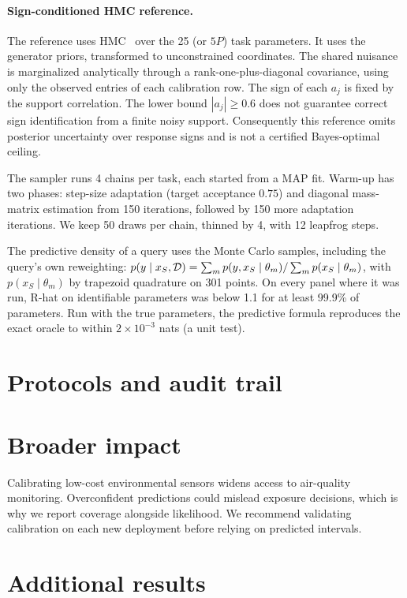 \paragraph{Sign-conditioned HMC reference.}
The reference uses HMC~\citep{neal2011hmc} over the 25 (or $5P$) task parameters. It uses the generator priors, transformed to
unconstrained coordinates. The shared nuisance is marginalized analytically through a rank-one-plus-diagonal
covariance, using only the observed entries of each calibration row. The sign of each $a_j$ is fixed by the support
correlation. The lower bound $|a_j|\geq0.6$ does not guarantee correct sign identification from a finite noisy support.
Consequently this reference omits posterior uncertainty over response signs and is not a certified Bayes-optimal ceiling.

The sampler runs 4 chains per task, each started from a MAP fit. Warm-up has two phases: step-size adaptation (target
acceptance $0.75$) and diagonal mass-matrix estimation from 150 iterations, followed by 150 more adaptation
iterations. We keep 50 draws per chain, thinned by 4, with 12 leapfrog steps.

The predictive density of a query uses the Monte Carlo samples, including the query's own reweighting:
$p(y\mid x_S,\mathcal{D})=\sum_m p(y,x_S\mid\theta_m)/\sum_m p(x_S\mid\theta_m)$, with $p(x_S\mid\theta_m)$ by trapezoid
quadrature on 301 points. On every panel where it was run, R-hat on identifiable parameters was below 1.1 for at
least 99.9\% of parameters. Run with the true parameters, the predictive formula reproduces the exact oracle to
within $2\times10^{-3}$ nats (a unit test).

\section{Protocols and audit trail}
\label{app:audit}



\section{Broader impact}
\label{app:impact}
Calibrating low-cost environmental sensors widens access to air-quality monitoring. Overconfident predictions could
mislead exposure decisions, which is why we report coverage alongside likelihood. We recommend validating calibration
on each new deployment before relying on predicted intervals.

\section{Additional results}
\label{app:more}






